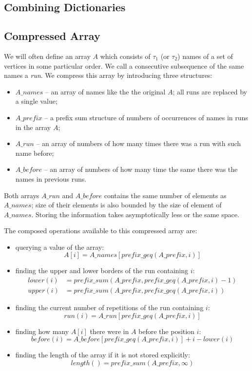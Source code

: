 \subsection{Combining Dictionaries}

\subsection{Compressed Array}

We will often define an array $A$ which consists of $\tau_1$ (or $\tau_2$) names of a set of vertices in some particular order.
We call a consecutive subsequence of the same names a \emph{run}.
We compress this array by introducing three structures:
\begin{itemize}
	\item $A\_names$ -- an array of names like the the original $A$; all runs are replaced by a single value;
	\item $A\_prefix$ -- a prefix sum structure of numbers of occurrences of names in runs in the array $A$;
	\item $A\_run$ -- an array of numbers of how many times there was a run with such name before;
	\item $A\_before$ -- an array of numbers of how many time the same there was the names in previous runs.
\end{itemize}

Both arrays $A\_run$ and $A\_before$ contains the same number of elements as $A\_names$; size of their elements is also bounded by the size of element of $A\_names$.
Storing the information takes asymptotically less or the same space.

The composed operations available to this compressed array are:
\begin{itemize}
	\item querying a value of the array:
		$$A[i] = A\_names[prefix\_geq(A\_prefix, i)]$$
	\item finding the upper and lower borders of the run containing $i$: 
	\begin{align*}
		lower(i) &= prefix\_sum(A\_prefix, prefix\_geq(A\_prefix, i) - 1) \\
		upper(i) &= prefix\_sum(A\_prefix, prefix\_geq(A\_prefix, i))
	\end{align*} 
	\item finding the current number of repetitions of the run containing $i$:
	$$ run(i) = A\_run[prefix\_geq(A\_prefix, i)] $$
	\item finding how many $A[i]$ there were in $A$ before the position $i$:
	$$ before(i) = A\_before[prefix\_geq(A\_prefix, i)] + i - lower(i) $$
	\item finding the length of the array if it is not stored explicitly:
	$$ length() = prefix\_sum(A\_prefix, \infty)$$
\end{itemize}

